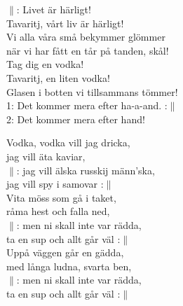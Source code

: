 \documentclass[a6paper, 10pt, twoside]{article}
\begin{document}
\noindent
\begin{center}
\end{center}
\begin{lyrics}
$\|$: Livet är härligt!\\
Tavaritj, vårt liv är härligt!\\
Vi alla våra små bekymmer glömmer\\
när vi har fått en tår på tanden, skål!\\
Tag dig en vodka!\\
Tavaritj, en liten vodka!\\
Glasen i botten vi tillsammans tömmer! 
\vspace{5pt}\\
1: Det kommer mera efter ha-a-and. :$\|$
\vspace{5pt}\\
2: Det kommer mera efter hand! 
\end{lyrics}
\begin{center}
\end{center}
\begin{lyrics}
Vodka, vodka vill jag dricka, \\
jag vill äta kaviar, \\
$\|$: jag vill älska russkij männ'ska, \\
jag vill spy i samovar :$\|$
\vspace{5pt}\\
Vita möss som gå i taket, \\
råma hest och falla ned, \\
$\|$: men ni skall inte var rädda, \\
ta en sup och allt går väl :$\|$
\vspace{5pt}\\
Uppå väggen går en gädda, \\
med långa ludna, svarta ben, \\
$\|$: men ni skall inte var rädda, \\
ta en sup och allt går väl :$\|$
\end{lyrics}
\end{document}
